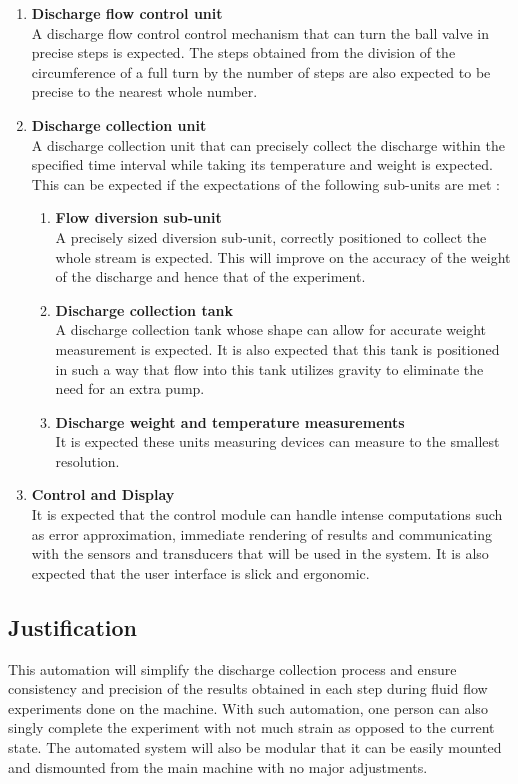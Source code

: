 \begin{enumerate}
    \item \textbf{Discharge flow control unit}\\
    A discharge flow control control mechanism that can turn the ball valve in precise steps is expected. The steps obtained from the division of the circumference of a full turn by the number of steps are also expected to be precise to the nearest whole number.
    \item \textbf{Discharge collection unit}\\
    A discharge collection unit that can precisely collect the discharge within the specified time interval while taking its temperature and weight is expected. This can be expected if the expectations of the following sub-units are met :
    \begin{enumerate}
        \item \textbf{Flow diversion sub-unit}\\
        A precisely sized diversion sub-unit, correctly positioned to collect the whole stream is expected. This will improve on the accuracy of the weight of the discharge and hence that of the experiment.
        \item \textbf{Discharge collection tank}\\
        A discharge collection tank whose shape can allow for accurate weight measurement is expected. It is also expected that this tank is positioned in such a way that flow into this tank utilizes gravity to eliminate the need for an extra pump.
        \item \textbf{Discharge weight and temperature measurements}\\
        It is expected these units measuring devices can measure to the smallest resolution.
    \end{enumerate}
    \item \textbf{Control and Display}\\
    It is expected that the control module can handle intense computations such as error approximation, immediate rendering of results and communicating with the sensors and transducers that will be used in the system. It is also expected that the user interface is slick and ergonomic.
\end{enumerate}

\subsection{Justification}

This automation will simplify the discharge collection process and ensure consistency and precision of the results obtained in each step during fluid flow experiments done on the machine. With such automation, one person can also singly complete the experiment with not much strain as opposed to the current state. The automated system will also be modular that it can be easily mounted and dismounted from the main machine with no major adjustments.